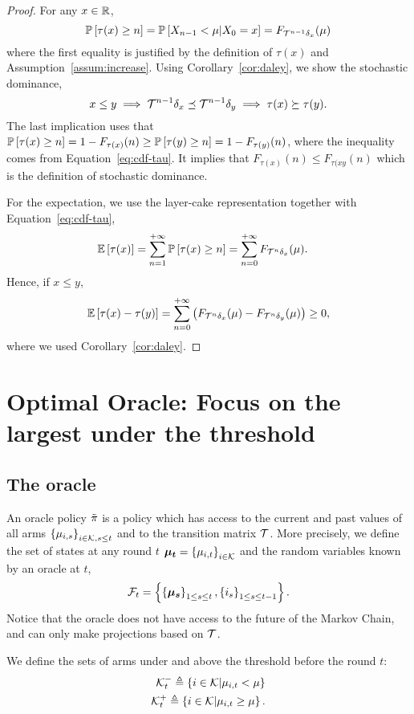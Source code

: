 \begin{proof}
For any $x\in \mathbb{R}$, 
\begin{equation}
\label{eq:cdf-tau}
\mathbb{P}\left[\tau(x) \geq n\right] = \mathbb{P}\left[X_{n-1} < \mu| X_0=x\right] = F_{\mathcal{T}^{n-1}\delta_{x}}(\mu)
\end{equation}
where the first equality is justified by the definition of $\tau(x)$ and Assumption~\ref{assum:increase}. Using Corollary~\ref{cor:daley}, we show the stochastic dominance,  
\[
x \leq y \implies \mathcal{T}^{n-1}\delta_{x} \preceq \mathcal{T}^{n-1}\delta_{y} \implies \tau(x) \succeq \tau(y).
\]
The last implication uses that $\mathbb{P}\left[\tau(x) \geq n\right] = 1-F_{\tau(x)}(n) \geq \mathbb{P}\left[\tau(y) \geq n\right] = 1-F_{\tau(y)}(n)$, where the inequality comes from Equation~\ref{eq:cdf-tau}. It implies that $F_{\tau(x)}(n) \leq F_{\tau(xy}(n)$ which is the definition of stochastic dominance. 

For the expectation, we use the layer-cake representation together with Equation~\ref{eq:cdf-tau}, 
\begin{align*}
\mathbb{E}\left[\tau(x)\right] &=  \sum_{n=1}^{+\infty} \mathbb{P}\left[\tau(x) \geq n\right] = \sum_{n=0}^{+ \infty} F_{\mathcal{T}^{n}\delta_{x}}(\mu).
\end{align*}
Hence, if $x \leq y$,
\[
\mathbb{E}\left[\tau(x) - \tau(y)\right] =  \sum_{n=0}^{+ \infty} \left(F_{\mathcal{T}^{n}\delta_{x}}(\mu) - F_{\mathcal{T}^{n}\delta_{y}}(\mu)\right) \geq 0,
\]
where we used Corollary~\ref{cor:daley}. 
\end{proof}
\section{Optimal Oracle: Focus on the largest under the threshold}
\label{sec:oracle}

\subsection{The {\FLUT} oracle }
An oracle policy $\Tilde{\pi}$ is a policy which has access to the current and past values of all arms $\left\{\mu_{i,s}\right\}_{i \in \mathcal{K}, s \leq t}$ and to the transition matrix $\mathcal{T}$. More precisely, we define the set of states at any round $t$ $\boldsymbol{\mu_t} = \left\{\mu_{i,t}\right\}_{i \in \mathcal{K}}$ and the random variables known by an oracle at $t$, 
\[\mathcal{F}_t = \left\{\left\{\boldsymbol{\mu}_{\boldsymbol{s}}\right\}_{1 \leq s\leq t}, \left\{i_s\right\}_{1 \leq s \leq t-1}\right\}.\]
 Notice that the oracle does not have access to the future of the Markov Chain, and can only make projections based on $\mathcal{T}$.

We define the sets of arms under and above the threshold before the round $t$: 
\begin{align*}
\mathcal{K}_t^- \triangleq \left\{i \in \mathcal{K} | \mu_{i,t} < \mu \right\}\\
\mathcal{K}_t^+\triangleq \left\{i \in \mathcal{K} | \mu_{i,t} \geq \mu \right\}.
\end{align*}


